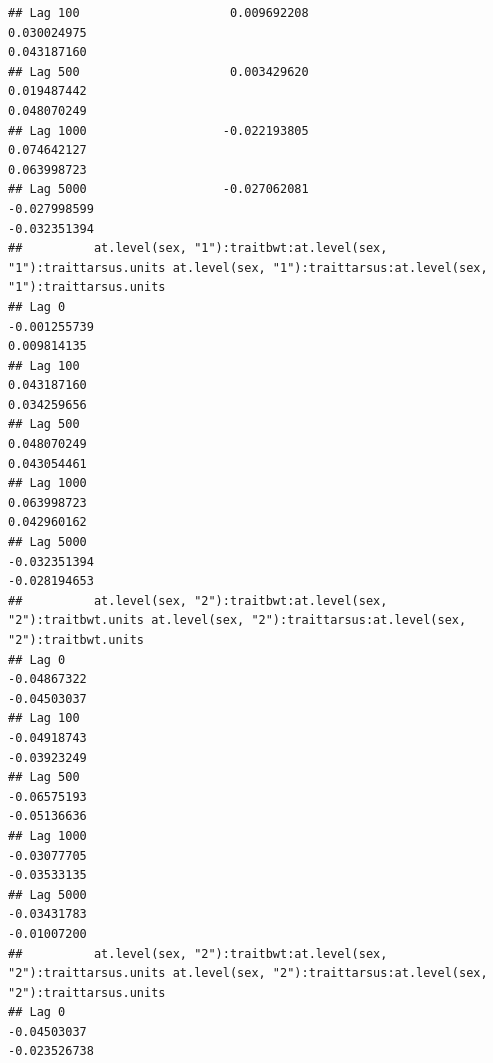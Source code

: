 \documentclass[
  12pt,
]{book}
\begin{document}
\begin{verbatim}
## Lag 100                     0.009692208                                                   0.030024975                                                      0.043187160
## Lag 500                     0.003429620                                                   0.019487442                                                      0.048070249
## Lag 1000                   -0.022193805                                                   0.074642127                                                      0.063998723
## Lag 5000                   -0.027062081                                                  -0.027998599                                                     -0.032351394
##          at.level(sex, "1"):traitbwt:at.level(sex, "1"):traittarsus.units at.level(sex, "1"):traittarsus:at.level(sex, "1"):traittarsus.units
## Lag 0                                                        -0.001255739                                                         0.009814135
## Lag 100                                                       0.043187160                                                         0.034259656
## Lag 500                                                       0.048070249                                                         0.043054461
## Lag 1000                                                      0.063998723                                                         0.042960162
## Lag 5000                                                     -0.032351394                                                        -0.028194653
##          at.level(sex, "2"):traitbwt:at.level(sex, "2"):traitbwt.units at.level(sex, "2"):traittarsus:at.level(sex, "2"):traitbwt.units
## Lag 0                                                      -0.04867322                                                      -0.04503037
## Lag 100                                                    -0.04918743                                                      -0.03923249
## Lag 500                                                    -0.06575193                                                      -0.05136636
## Lag 1000                                                   -0.03077705                                                      -0.03533135
## Lag 5000                                                   -0.03431783                                                      -0.01007200
##          at.level(sex, "2"):traitbwt:at.level(sex, "2"):traittarsus.units at.level(sex, "2"):traittarsus:at.level(sex, "2"):traittarsus.units
## Lag 0                                                         -0.04503037                                                        -0.023526738

\end{verbatim}
\end{document}
